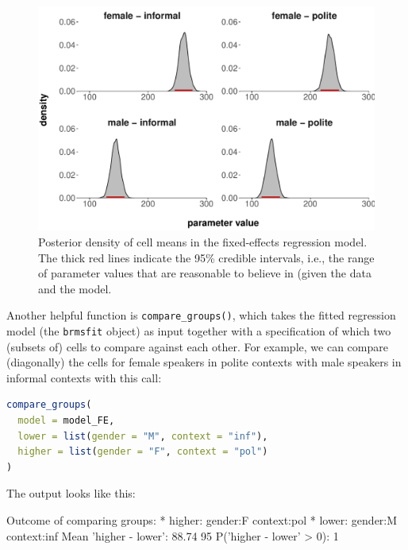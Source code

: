 \documentclass[nobib]{tufte-handout}
\begin{document}
\begin{figure}
  \centering
  \includegraphics[width=\textwidth]{pics/posterior_density_cell_means.pdf}
  \caption[Posteriors over cell means in fixed-effects model]{Posterior density of cell means
    in the fixed-effects regression model. The thick red lines indicate the 95\% credible
    intervals, i.e., the range of parameter values that are reasonable to believe in (given the data and the model.}
  \label{fig:Posteriors_cell_means}
\end{figure}


Another helpful function is \texttt{compare\_groups()}, which takes the fitted regression model (the \texttt{brmsfit} object) as input together with a specification of which two (subsets of) cells to compare
against each other. For example, we can compare (diagonally) the cells for female speakers in
polite contexts with male speakers in informal contexts with this call:

\begin{minipage}[]{1.3\textwidth}
\begin{lstlisting}[language=R]
compare_groups(
  model = model_FE, 
  lower = list(gender = "M", context = "inf"),
  higher = list(gender = "F", context = "pol")
)
\end{lstlisting}
\end{minipage}

\noindent The output looks like this:

\medskip

\begin{minipage}[]{\textwidth}
\begin{rc}
Outcome of comparing groups:
 * higher:  gender:F context:pol 
 * lower:   gender:M context:inf 
Mean 'higher - lower':  88.74 
95%
P('higher - lower' > 0):  1 
\end{rc}
\end{minipage}
\end{document}
